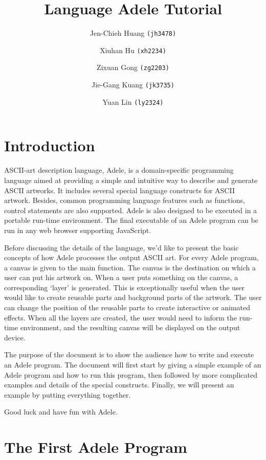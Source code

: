 \documentclass[11pt,letterpaper]{article}
\begin{document}
\title {Language Adele Tutorial}
\author {
	Jen-Chieh Huang \texttt{(jh3478)} \and Xiuhan Hu \texttt{(xh2234)} \and     
	Zixuan Gong \texttt{(zg2203)} \and Jie-Gang Kuang \texttt{(jk3735)} \and 
	Yuan Lin \texttt{(ly2324)}
}
\maketitle
\pagebreak
\tableofcontents
\pagebreak
\section {Introduction}

ASCII-art description language, Adele, is a domain-specific programming language aimed at providing a simple and intuitive way to describe and generate ASCII artworks. It includes several special language constructs for ASCII artwork. Besides, common programming language features such as functions, control statements are also supported. Adele is also designed to be executed in a portable run-time environment. The final executable of an Adele program can be run in any web browser supporting JavaScript. 

Before discussing the details of the language, we'd like to present the basic concepts of how Adele processes the output ASCII art. For every Adele program, a canvas is given to the main function. The canvas is the destination on which a user can put his artwork on. When a user puts something on the canvas, a corresponding `layer' is generated. This is exceptionally useful when the user would like to create reusable parts and background parts of the artwork. The user can change the position of the reusable parts to create interactive or animated effects. When all the layers are created, the user would need to inform the run-time environment, and the resulting canvas will be displayed on the output device.

The purpose of the document is to show the audience how to write and execute an Adele program. The document will first start by giving a simple example of an Adele program and how to run this program, then followed by more complicated examples and details of the special constructs. Finally, we will present an example by putting everything together.

Good luck and have fun with Adele.

\section {The First Adele Program}
\end{document}
